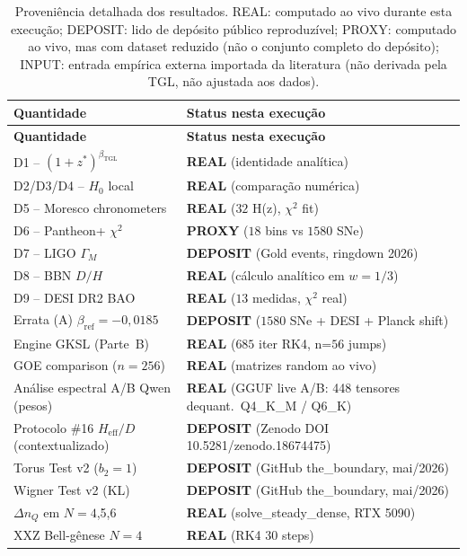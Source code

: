 \documentclass[12pt,a4paper]{article}
\newcommand{\betatgl}{\beta_{\text{TGL}}}
\newcommand{\TGL}{\textsc{TGL}}
\begin{document}
\begin{longtable}{p{} p{}}
\caption{Proveniência detalhada dos resultados.  REAL: computado ao vivo
durante esta execução; DEPOSIT: lido de depósito público reproduzível;
PROXY: computado ao vivo, mas com dataset reduzido (não o conjunto
completo do depósito); INPUT: entrada empírica externa importada da
literatura (não derivada pela \TGL{}, não ajustada aos dados).}\label{tab:provenance}\\
\toprule
\textbf{Quantidade} & \textbf{Status nesta execução} \\
\midrule
\endfirsthead
\toprule
\textbf{Quantidade} & \textbf{Status nesta execução} \\
\midrule
\endhead
D1 -- $(1+z^*)^{\betatgl}$ & \textbf{REAL} (identidade analítica) \\
D2/D3/D4 -- $H_0$ local & \textbf{REAL} (comparação numérica) \\
D5 -- Moresco chronometers & \textbf{REAL} ($32$ H(z), $\chi^2$ fit) \\
D6 -- Pantheon+ $\chi^2$ & \textbf{PROXY} ($18$ bins vs $1580$ SNe) \\
D7 -- LIGO $\Gamma_M$ & \textbf{DEPOSIT} (Gold events, ringdown 2026) \\
D8 -- BBN $D/H$ & \textbf{REAL} (cálculo analítico em $w=1/3$) \\
D9 -- DESI DR2 BAO & \textbf{REAL} ($13$ medidas, $\chi^2$ real) \\
Errata (A) $\beta_{\text{ref}} = -0{,}0185$ & \textbf{DEPOSIT} ($1580$ SNe + DESI + Planck shift) \\
Engine GKSL (Parte~B) & \textbf{REAL} ($685$ iter RK4, n=$56$ jumps) \\
GOE comparison ($n=256$) & \textbf{REAL} (matrizes random ao vivo) \\
Análise espectral A/B Qwen (pesos) & \textbf{REAL} (GGUF live A/B: 448 tensores dequant.\ Q4\_K\_M / Q6\_K) \\
Protocolo \#16 $H_{\text{eff}}/D$ (contextualizado) & \textbf{DEPOSIT} (Zenodo DOI 10.5281/zenodo.18674475) \\
Torus Test v2 ($b_2=1$) & \textbf{DEPOSIT} (GitHub the\_boundary, mai/2026) \\
Wigner Test v2 (KL) & \textbf{DEPOSIT} (GitHub the\_boundary, mai/2026) \\
$\Delta n_Q$ em $N=4$,5,6 & \textbf{REAL} (solve\_steady\_dense, RTX 5090) \\
XXZ Bell-gênese $N=4$ & \textbf{REAL} (RK4 $30$ steps) \\

\end{longtable}
\end{document}
